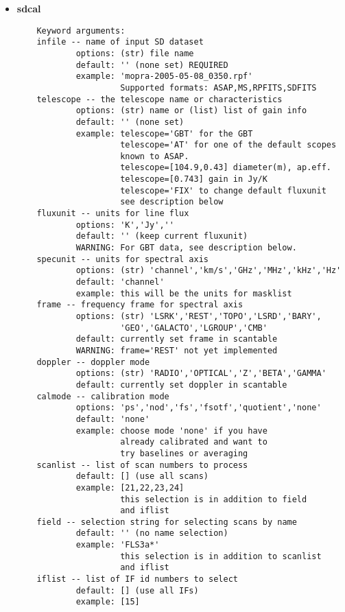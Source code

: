 \begin{itemize}
\item {\bf sdcal}

\begin{verbatim}
    Keyword arguments:
    infile -- name of input SD dataset
            options: (str) file name
            default: '' (none set) REQUIRED
            example: 'mopra-2005-05-08_0350.rpf'
                     Supported formats: ASAP,MS,RPFITS,SDFITS
    telescope -- the telescope name or characteristics
            options: (str) name or (list) list of gain info
            default: '' (none set)
            example: telescope='GBT' for the GBT
                     telescope='AT' for one of the default scopes
                     known to ASAP.
                     telescope=[104.9,0.43] diameter(m), ap.eff.
                     telescope=[0.743] gain in Jy/K
                     telescope='FIX' to change default fluxunit
                     see description below
    fluxunit -- units for line flux
            options: 'K','Jy',''
            default: '' (keep current fluxunit)
            WARNING: For GBT data, see description below.
    specunit -- units for spectral axis
            options: (str) 'channel','km/s','GHz','MHz','kHz','Hz'
            default: 'channel'
            example: this will be the units for masklist
    frame -- frequency frame for spectral axis
            options: (str) 'LSRK','REST','TOPO','LSRD','BARY',
                     'GEO','GALACTO','LGROUP','CMB'
            default: currently set frame in scantable
            WARNING: frame='REST' not yet implemented
    doppler -- doppler mode
            options: (str) 'RADIO','OPTICAL','Z','BETA','GAMMA'
            default: currently set doppler in scantable
    calmode -- calibration mode
            options: 'ps','nod','fs','fsotf','quotient','none'
            default: 'none'
            example: choose mode 'none' if you have
                     already calibrated and want to
                     try baselines or averaging
    scanlist -- list of scan numbers to process
            default: [] (use all scans)
            example: [21,22,23,24]
                     this selection is in addition to field
                     and iflist
    field -- selection string for selecting scans by name
            default: '' (no name selection)
            example: 'FLS3a*'
                     this selection is in addition to scanlist
                     and iflist
    iflist -- list of IF id numbers to select
            default: [] (use all IFs)
            example: [15]

\end{verbatim}
\end{itemize}
